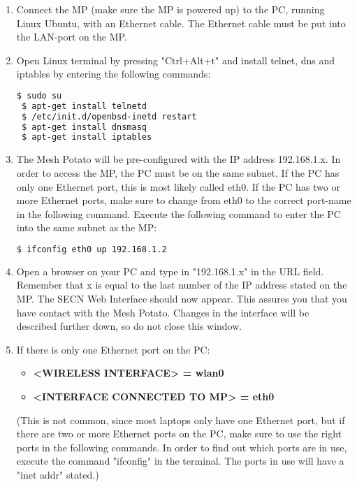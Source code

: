 

\begin{enumerate}
\item Connect the MP (make sure the MP is powered up) to the PC, running Linux Ubuntu, with an Ethernet cable. The Ethernet cable must be put into the LAN-port on the MP. 

\item Open Linux terminal by pressing "Ctrl+Alt+t" and install telnet, dns and iptables by entering the following commands: 
\noindent
\begin{lstlisting}[language=bash]
 $ sudo su
 $ apt-get install telnetd
 $ /etc/init.d/openbsd-inetd restart 
 $ apt-get install dnsmasq
 $ apt-get install iptables
\end{lstlisting}

\item The Mesh Potato will be pre-configured with the IP address 192.168.1.x. In order to access the MP, the PC must be on the same subnet. If the PC has only one Ethernet port, this is most likely called eth0. If the PC has two or more Ethernet ports, make sure to change from eth0 to the correct port-name in the following command. Execute the following command to enter the PC into the same subnet as the MP: 
\noindent
\begin{lstlisting}[language=bash]
  $ ifconfig eth0 up 192.168.1.2
\end{lstlisting}

\item Open a browser on your PC and type in "192.168.1.x" in the URL field. Remember that x is equal to the last number of the IP address stated on the MP. The SECN Web Interface should now appear. This assures you that you have contact with the Mesh Potato. Changes in the interface will be described further down, so do not close this window.  

\item  
If there is only one Ethernet port on the PC:
\begin{itemize} 
\item [] \textbf{<WIRELESS INTERFACE> = wlan0}
\item [] \textbf{<INTERFACE CONNECTED TO MP> = eth0}
\end{itemize}

(This is not common, since most laptops only have one Ethernet port, but if there are two or more Ethernet ports on the PC, make sure to use the right ports in the following commands. In order to find out which ports are in use, execute the command "ifconfig" in the terminal. The ports in use will have a "inet addr" stated.) 


\end{enumerate}
